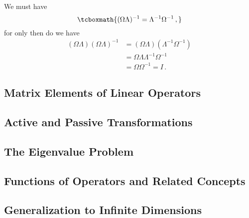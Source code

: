 We must have
\begin{equation}\label{operator product inverse}
    \tcboxmath{(\Omega\Lambda)^{-1} = \Lambda^{-1}\Omega^{-1}\,,}
\end{equation}
for only then do we have
\begin{align}
    (\Omega\Lambda)(\Omega\Lambda)^{-1} &= (\Omega\Lambda)(\Lambda^{-1}\Omega^{-1}) \\
    &= \Omega\Lambda\Lambda^{-1}\Omega^{-1} \\
    &= \Omega\Omega^{-1} = I\,.
\end{align}


\subsection{Matrix Elements of Linear Operators}


\subsection{Active and Passive Transformations}


\subsection{The Eigenvalue Problem}


\subsection{Functions of Operators and Related Concepts}


\subsection{Generalization to Infinite Dimensions}
